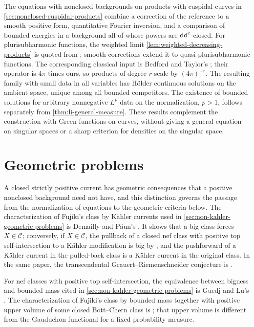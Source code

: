 The equations with nonclosed backgrounds on products with cuspidal curves in \cref{sec:nonclosed-cuspidal-products} combine a correction of the reference to a smooth positive form, quantitative Fourier inversion, and a comparison of bounded energies in a background all of whose powers are $\mathrm{dd}^{\mathrm{c}}$-closed. For plurisubharmonic functions, the weighted limit \cref{lem:weighted-decreasing-products} is quoted from \cite[Theorem~3.18]{GZ17}; smooth corrections extend it to quasi-plurisubharmonic functions. The corresponding classical input is Bedford and Taylor's \cite[Theorem~2.4 and its proof, pp.~7--9]{BT82}; their operator is $4\pi$ times ours, so products of degree $r$ scale by $(4\pi)^{-r}$. The resulting family with small data in all variables has H\"older continuous solutions on the ambient space, unique among all bounded competitors. The existence of bounded solutions for arbitrary nonnegative $L^p$ data on the normalization, $p>1$, follows separately from \cref{thm:li-general-measure}. These results complement the construction with Green functions on curves, without giving a general equation on singular spaces or a sharp criterion for densities on the singular space.

\section{Geometric problems}
\label{sec:history-geometry}

A closed strictly positive current has geometric consequences that a positive nonclosed background need not have, and this distinction governs the passage from the normalization of equations to the geometric criteria below. The characterization of Fujiki's class by K\"ahler currents used in \cref{sec:non-kahler-geometric-problems} is Demailly and P{\u a}un's \cite[Theorem 0.7]{DP04}. It shows that a big class forces $X\in\mathcal C$; conversely, if $X\in\mathcal C$, the pullback of a closed nef class with positive top self-intersection to a K\"ahler modification is big by \cite[Theorem~0.5]{DP04}, and the pushforward of a K\"ahler current in the pulled-back class is a K\"ahler current in the original class. In the same paper, the transcendental Grauert--Riemenschneider conjecture is \cite[Conjecture 0.8]{DP04}.

For nef classes with positive top self-intersection, the equivalence between bigness and bounded mass cited in \cref{sec:non-kahler-geometric-problems} is Guedj and Lu's \cite[Theorem 4.9]{GL22}. The characterization of Fujiki's class by bounded mass together with positive upper volume of some closed Bott--Chern class is \cite[Theorem C]{BGL25}; that upper volume is different from the Gauduchon functional for a fixed probability measure.

